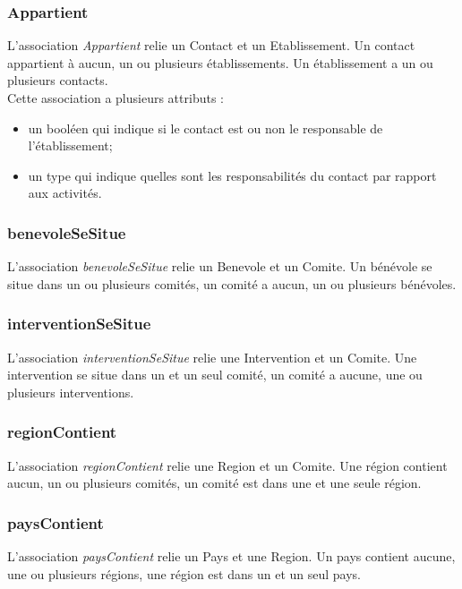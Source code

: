 \subsubsection*{Appartient}

L'association \textit{Appartient} relie un Contact et un Etablissement. Un contact appartient à aucun, un ou plusieurs établissements. Un établissement a un ou plusieurs contacts.\\
Cette association a plusieurs attributs :
\begin{itemize}
\item un booléen qui indique si le contact est ou non le responsable de l'établissement; 
\item un type qui indique quelles sont les responsabilités du contact par rapport aux activités.
\end{itemize}


\subsubsection*{benevoleSeSitue}

L'association \textit{benevoleSeSitue} relie un Benevole et un Comite. Un bénévole se situe dans un ou plusieurs comités, un comité a aucun, un ou plusieurs bénévoles.

\subsubsection*{interventionSeSitue}

L'association \textit{interventionSeSitue} relie une Intervention et un Comite. Une intervention se situe dans un et un seul comité, un comité a aucune, une ou plusieurs interventions.

\subsubsection*{regionContient}

L'association \textit{regionContient} relie une Region et un Comite. Une région contient aucun, un ou plusieurs comités, un comité est dans une et une seule région.

\subsubsection*{paysContient}

L'association \textit{paysContient} relie un Pays et une Region. Un pays contient aucune, une ou plusieurs régions, une région est dans un et un seul pays.

